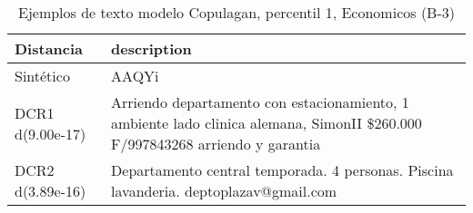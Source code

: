 \begin{table}[H]
\centering
\fontsize{10}{14}\selectfont
\caption{Ejemplos de texto modelo Copulagan, percentil 1, Economicos (B-3)}
\label{table-example-economicos-b-3-copulagan-1p-text}
\begin{tabular}{|l|m{35em}|}
\hline
\rowcolor[gray]{0.8}
Distancia & description \\
\hline Sintético & AAQYi \\
\hline DCR1 d(9.00e-17) & Arriendo departamento con estacionamiento, 1 ambiente lado clinica alemana, SimonII \$260.000 F/997843268 arriendo y garantia \\
\hline DCR2 d(3.89e-16) & Departamento central temporada. 4 personas. Piscina lavanderia.  deptoplazav@gmail.com \\
\hline
\end{tabular}
\end{table}
